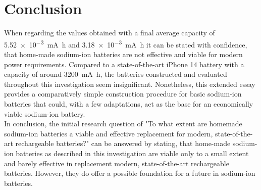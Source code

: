 \section{Conclusion}
When regarding the values obtained with a final average capacity of \SI{5.52e-3}{\mA\hour} and \SI{3.18e-3}{\mA\hour} it can be stated with confidence, that home-made sodium-ion batteries are not effective and viable for modern power requirements. Compared to a state-of-the-art iPhone 14 battery with a capacity of around \SI{3200}{\mA\hour}, the batteries constructed and evaluated throughout this investigation seem insignificant\cite{Miller2022}. Nonetheless, this extended essay provides a comparatively simple construction procedure for basic sodium-ion batteries that could, with a few adaptations, act as the base for an economically viable sodium-ion battery.\\
In conclusion, the initial research question of "To what extent are homemade sodium-ion batteries a viable and effective replacement for modern, state-of-the-art rechargeable batteries?" can be answered by stating, that home-made sodium-ion batteries as described in this investigation are viable only to a small extent and barely effective in replacement modern, state-of-the-art rechargeable batteries. However, they do offer a possible foundation for a future in sodium-ion batteries.